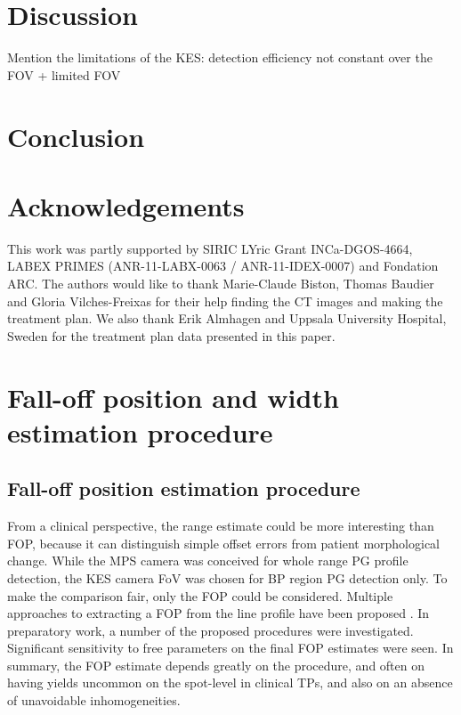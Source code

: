 \documentclass[a4paper,english,12pt]{article}
\begin{document}
\section{Discussion}

Mention the limitations of the KES: detection efficiency not constant over the FOV + limited FOV


\section{Conclusion}


\section{Acknowledgements}

This work was partly supported by SIRIC LYric Grant INCa-DGOS-4664, LABEX PRIMES (ANR-11-LABX-0063 / ANR-11-IDEX-0007) and Fondation ARC. The authors would like to thank Marie-Claude Biston, Thomas Baudier and Gloria Vilches-Freixas for their help finding the CT images and making the treatment plan. We also thank Erik Almhagen and Uppsala University Hospital, Sweden for the treatment plan data presented in this paper.

\newpage

\appendix
% 

\section{Fall-off position and width estimation procedure}\label{sec:fopproc}

\subsection{Fall-off position estimation procedure}

From a clinical perspective, the range estimate could be more interesting than FOP, because it can distinguish simple offset errors from patient morphological change. While the MPS camera was conceived for whole range PG profile detection, the KES camera FoV was chosen for BP region PG detection only. To make the comparison fair, only the FOP could be considered. Multiple approaches to extracting a FOP from the line profile have been proposed \citep{Smeets2012,Gueth2013,Roellinghoff2014a,Janssen2014,Sterpin2015}. In preparatory work, a number of the proposed procedures were investigated. Significant sensitivity to free parameters on the final FOP estimates were seen. In summary, the FOP estimate depends greatly on the procedure, and often on having yields uncommon on the spot-level in clinical TPs, and also on an absence of unavoidable inhomogeneities.
\end{document}
